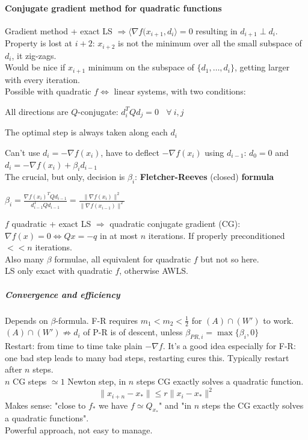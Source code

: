 \documentclass[10pt]{report}
\begin{document}
\paragraph{Conjugate gradient method for quadratic functions} Gradient method + exact LS $\Rightarrow \langle \nabla f(x_{i+1}, d_i\rangle = 0$ resulting in $d_{i+1} \perp d_i$. Property is lost at $i+2$: $x_{i+2}$ is not the minimum over all the small subspace of $d_i$, it zig-zags.\\
Would be nice if $x_{i+1}$ minimum on the subspace of $\{d_1,\ldots,d_i\}$, getting larger with every iteration.\\
Possible with quadratic $f\Leftrightarrow$ linear systems, with two conditions:
\begin{list}{}{}
	\item All directions are $Q$-conjugate: $d_i^TQd_j=0\:\:\:\:\forall\:i,j$
	\item The optimal step is always taken along each $d_i$
\end{list}
Can't use $d_i = -\nabla f(x_i)$, have to deflect $-\nabla f(x_i)$ using $d_{i-1}$: $d_0 = 0$ and $d_i = -\nabla f(x_i) + \beta_id_{i-1}$\\
The crucial, but only, decision is $\beta_i$: \textbf{Fletcher-Reeves} (closed) \textbf{formula}
\begin{list}{}{}
	\item $\beta_i = \frac{\displaystyle \nabla f(x_i)^T Qd_{i-1}}{\displaystyle d_{i-1}^TQd_{i-1}} = \frac{\displaystyle \|\nabla f(x_i)\|^2}{\displaystyle \|\nabla f(x_{i-1})\|^2}$
\end{list}
$f$ quadratic + exact LS $\Rightarrow$ quadratic conjugate gradient (CG): $\nabla f(x) = 0 \Leftrightarrow Qx = -q$ in at most $n$ iterations. If properly preconditioned $<< n$ iterations.\\
Also many $\beta$ formulae, all equivalent for quadratic $f$ but not so here.\\
LS only exact with quadratic $f$, otherwise AWLS.
\subparagraph{Convergence and efficiency} Depends on $\beta$-formula. F-R requires $m_1<m_2<\frac{1}{2}$ for $(A)\cap(W')$ to work.\\
$(A)\cap(W')\not\Rightarrow d_i$ of P-R is of descent, unless $\beta_{PR,i} = \max\{\beta_i, 0\}$\\
Restart: from time to time take plain $-\nabla f$. It's a good idea especially for F-R: one bad step leads to many bad steps, restarting cures this. Typically restart after $n$ steps.\\
$n$ CG steps $\simeq 1$ Newton step, in $n$ steps CG exactly solves a quadratic function.
$$\|x_{i+n}-x_*\|\leq r\|x_i-x_*\|^2$$
Makes sense: "close to $f_*$ we have $f\simeq Q_{x_*}$" and "in $n$ steps the CG exactly solves a quadratic functions".\\
Powerful approach, not easy to manage.
\end{document}
